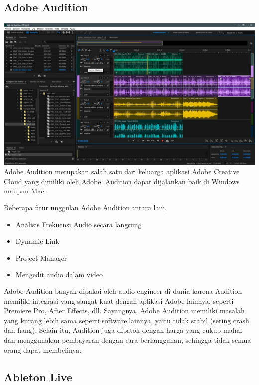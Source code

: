 \hypertarget{adobe-audition}{%
\subsection{Adobe Audition}\label{adobe-audition}}

\includegraphics{images/audition.jpg} Adobe Audition merupakan salah
satu dari keluarga aplikasi Adobe Creative Cloud yang dimiliki oleh
Adobe. Audition dapat dijalankan baik di Windows maupun Mac.

Beberapa fitur unggulan Adobe Audition antara lain,

\begin{itemize}
\tightlist
\item
  Analisis Frekuensi Audio secara langsung
\item
  Dynamic Link
\item
  Project Manager
\item
  Mengedit audio dalam video
\end{itemize}

Adobe Audition banyak dipakai oleh audio engineer di dunia karena
Audition memiliki integrasi yang sangat kuat dengan aplikasi Adobe
lainnya, seperti Premiere Pro, After Effects, dll. Sayangnya, Adobe
Audition memiliki masalah yang kurang lebih sama seperti software
lainnya, yaitu tidak stabil (sering crash dan hang). Selain itu,
Audition juga dipatok dengan harga yang cukup mahal dan menggunakan
pembayaran dengan cara berlangganan, sehingga tidak semua orang dapat
membelinya.

\hypertarget{ableton-live}{%
\subsection{Ableton Live}\label{ableton-live}}

